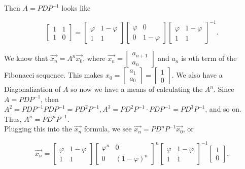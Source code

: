 \documentclass{article}
\begin{document}
Then $A=PDP^{-1}$ looks like

\begin{equation*}
    \begin{bmatrix}
        1 & 1 \\
        1 & 0
    \end{bmatrix} =
    \begin{bmatrix}
        \varphi & 1-\varphi \\
        1 & 1
    \end{bmatrix}
    \begin{bmatrix}
        \varphi & 0 \\
        0 & 1-\varphi
    \end{bmatrix}
    \begin{bmatrix}
        \varphi & 1-\varphi \\
        1 & 1
    \end{bmatrix}^{-1}.
\end{equation*}


We know that $\vec{x_n} = A^n \vec{x_0}$, where $\vec{x_n}=\begin{bmatrix} a_{n+1} \\ a_n \end{bmatrix}$ and $a_n$ is $n$th term of the Fibonacci sequence. This makes $x_0 = \begin{bmatrix} a_{1} \\ a_0 \end{bmatrix}=\begin{bmatrix} 1 \\ 0 \end{bmatrix}$. We also have a Diagonalization of $A$ so now we have a means of calculating the $A^n$. Since $A=PDP^{-1}$, then $A^2=PDP^{-1}PDP^{-1}= PD^2P^{-1}, A^3=PD^2P^{-1}\cdot PDP^{-1} = PD^3P^{-1}$, and so on. Thus, $A^n = PD^nP^{-1}.$ \\

Plugging this into the $\vec{x_n}$ formula, we see $\vec{x_n} = PD^nP^{-1} \vec{x_0}$, or 

\begin{equation*}
   \vec{x_n} =
     \begin{bmatrix}
        \varphi & 1-\varphi \\
        1 & 1
    \end{bmatrix}
    \begin{bmatrix}
        \varphi^n & 0 \\
        0 & (1-\varphi)^n
    \end{bmatrix}^n
    \begin{bmatrix}
        \varphi & 1-\varphi \\
        1 & 1
    \end{bmatrix}^{-1}
    \begin{bmatrix}
    1\\0
    \end{bmatrix}.
\end{equation*}
    
\end{document}
